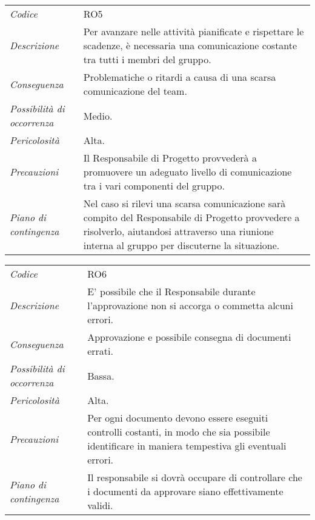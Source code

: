 {{{{{{{{{	\begin{center}
		\renewcommand{\arraystretch}{1.4}
		\begin{longtable}{|p{5cm}|p{12cm}|}
			\hline
			\rowcolor{airforceblue}
			\multicolumn{2}{|c|}{\textit{Scarsa comunicazione}}\\
			\hline
			\textit{Codice} & RO5 \\
			\hline
			\textit{Descrizione} & Per avanzare nelle attività pianificate e rispettare le scadenze, è necessaria una comunicazione costante tra tutti i membri del gruppo.\\
			\hline
			\textit{Conseguenza} & Problematiche o ritardi a causa di una scarsa comunicazione del team. \\
			\hline
			\textit{Possibilità di occorrenza} & Medio. \\
			\hline
			\textit{Pericolosità} & Alta. \\
			\hline
			\textit{Precauzioni} & Il Responsabile di Progetto provvederà a promuovere un adeguato livello di comunicazione tra i vari componenti del gruppo.  \\
			\hline
			\textit{Piano di contingenza} & Nel caso si rilevi una scarsa comunicazione sarà compito del Responsabile di Progetto provvedere a risolverlo, aiutandosi attraverso una riunione interna al gruppo per discuterne la situazione. \\
			\hline
		\end{longtable}
	\end{center}


\def\tabularxcolumn#1{m{#1}}
{
	
	\begin{center}
		\renewcommand{\arraystretch}{1.4}
		\begin{longtable}{|p{5cm}|p{12cm}|}
			\hline
			\rowcolor{airforceblue}
			\multicolumn{2}{|c|}{\textit{Approvazione errata dei documenti}}\\
			\hline
			\textit{Codice} & RO6 \\
			\hline
			\textit{Descrizione} & E' possibile che il Responsabile durante l'approvazione non si accorga o commetta alcuni errori.\\
			\hline
			\textit{Conseguenza} & Approvazione e possibile consegna di documenti errati. \\
			\hline
			\textit{Possibilità di occorrenza} & Bassa. \\
			\hline
			\textit{Pericolosità} & Alta. \\
			\hline
			\textit{Precauzioni} & Per ogni documento devono essere eseguiti controlli costanti, in modo che sia possibile identificare in maniera tempestiva gli eventuali errori.  \\
			\hline
			\textit{Piano di contingenza} & Il responsabile si dovrà occupare di controllare che i documenti da approvare siano effettivamente validi. \\
			\hline
		\end{longtable}
	\end{center}

}}}}}}}}}}
